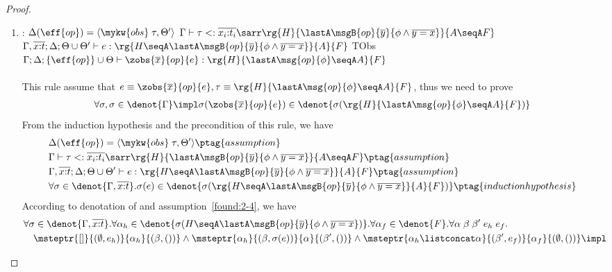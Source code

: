 \begin{proof}
\begin{enumerate}[label=Case]
\item:
{\footnotesize
\mprooftr{80mm}
{
  $\Delta(\eff{op}) =\langle \mykw{obs}\;\tau, \Theta'\rangle$ \quad
$\Gamma \vdash \tau <: \overline{x_i{:}t_i}\sarr
\rg{H}{\lastA\msgB{op}{\overline{y}}{\phi \land \overline{y = x}}}{A \seqA F}$ \quad
 $\Gamma, \overline{x{:}t}; \Delta; \Theta \cup \Theta' \vdash e : \rg{H \seqA \lastA\msgB{op}{\overline{y}}{\phi \land \overline{y = x}}}{A}{F}$
 }
{TObs}
{$\Gamma; \Delta; \{\eff{op}\} \cup \Theta \vdash \zobs{\overline{x}}{op}{e} : \rg{H}{\lastA\msg{op}{\phi}\seqA A}{F}$}
\ \\ \ \\}
This rule assume that $e \equiv \zobs{\overline{x}}{op}{e}, \tau \equiv\rg{H}{\lastA\msg{op}{\phi} \seqA A}{F}$, thus we need to prove
{\footnotesize\begin{align*}
    \forall \sigma, \sigma \in \denot{\Gamma} \impl \sigma(\zobs{\overline{x}}{op}{e}) \in \denot{\sigma(\rg{H}{\lastA\msg{op}{\phi} \seqA A}{F})}
\end{align*}}\noindent
From the induction hypothesis and the precondition of this rule, we have
{\footnotesize\begin{alignat}{2}
\setcounter{equation}{0}
&\Delta(\eff{op}) =\langle \mykw{obs}\;\tau, \Theta' \rangle \ptag{assumption} \label{found:2-1} \\
&\Gamma \vdash \tau <: \overline{x_i{:}t_i}\sarr\rg{H}{\lastA\msgB{op}{\overline{y}}{\phi \land \overline{y = x}}}{A \seqA F} \ptag{assumption} \label{found:2-2} \\
&\Gamma, \overline{x{:}t}; \Delta; \Theta \cup \Theta' \vdash e : \rg{H \seqA \lastA\msgB{op}{\overline{y}}{\phi \land \overline{y = x}}}{A}{F} \ptag{assumption} \label{found:2-3} \\
&\forall \sigma \in \denot{\Gamma, \overline{x{:}t}}. \sigma(e) \in \denot{\sigma(\rg{H \seqA \lastA\msgB{op}{\overline{y}}{\phi \land \overline{y = x}}}{A}{F})} \ptag{induction hypothesis} \label{found:2-4}
\end{alignat}}\noindent
According to denotation of \PAT and assumption~\ref{found:2-4}, we have
{\footnotesize\begin{alignat}{2}
&\forall \sigma \in\denot{\Gamma, \overline{x{:}t}}. \forall \alpha_h \in\denot{\sigma(H \seqA \lastA\msgB{op}{\overline{y}}{\phi \land \overline{y = x}})}.\forall \alpha_f \in\denot{F}. \forall \alpha\;\beta\;\beta'\;e_h\;e_f. \notag
\\&\quad \msteptr{[]}{(\emptyset, e_h)}{\alpha_h}{(\beta, ())} \land \msteptr{\alpha_h}{(\beta, \sigma(e))}{\alpha}{(\beta', ())} \land \msteptr{\alpha_h \listconcat \alpha }{(\beta', e_f)}{\alpha_f}{(\emptyset, ())} \impl \notag

\end{alignat}}
\end{enumerate}
\end{proof}
